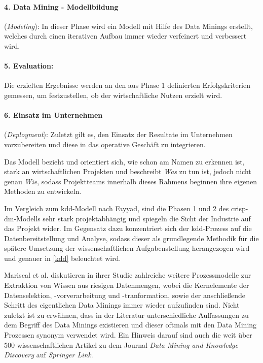 \paragraph{4. Data Mining - Modellbildung}(\textit{Modeling}): 
In dieser Phase wird ein Modell mit Hilfe des Data Minings erstellt, welches durch einen iterativen Aufbau immer wieder verfeinert und verbessert wird. 
\paragraph{5. Evaluation:}
Die erzielten Ergebnisse werden an den aus Phase 1 definierten Erfolgskriterien gemessen, um festzustellen, ob der wirtschaftliche Nutzen erzielt wird.
\paragraph{6. Einsatz im Unternehmen}(\textit{Deployment}): 
Zuletzt gilt es, den Einsatz der Resultate im Unternehmen vorzubereiten und diese in das operative Geschäft zu integrieren.

Das Modell bezieht und orientiert sich, wie schon am Namen zu erkennen ist, stark an wirtschaftlichen Projekten und beschreibt \textit{Was} zu tun ist, jedoch nicht genau \textit{Wie}, sodass Projektteams innerhalb dieses Rahmens beginnen ihre eigenen Methoden zu entwickeln.

Im Vergleich zum \gls{kdd}-Modell nach Fayyad, sind die Phasen 1 und 2 des \gls{crisp-dm}-Modells sehr stark projektabhängig und spiegeln die Sicht der Industrie auf das Projekt wider. Im Gegensatz dazu konzentriert sich der \gls{kdd}-Prozess auf die Datenbereitstellung und Analyse, sodass dieser als grundlegende Methodik für die spätere Umsetzung der wissenschaftlichen Aufgabenstellung herangezogen wird und genauer in \vref{kdd} beleuchtet wird.

Mariscal et al. diskutieren in ihrer Studie zahlreiche weitere Prozessmodelle zur Extraktion von Wissen aus riesigen Datenmengen, wobei die Kernelemente der Datenselektion, -vorverarbeitung und -tranformation, sowie der anschließende Schritt des eigentlichen Data Minings immer wieder aufzufinden sind. Nicht zuletzt ist zu erwähnen, dass in der Literatur unterschiedliche Auffassungen zu dem Begriff des Data Minings existieren und dieser oftmals mit den Data Mining Prozessen synonym verwendet wird. Ein Hinweis darauf sind auch die weit über 500 wissenschaftlichen Artikel zu dem Journal \textit{Data Mining and Knowledge Discovery} auf \textit{Springer Link}.

